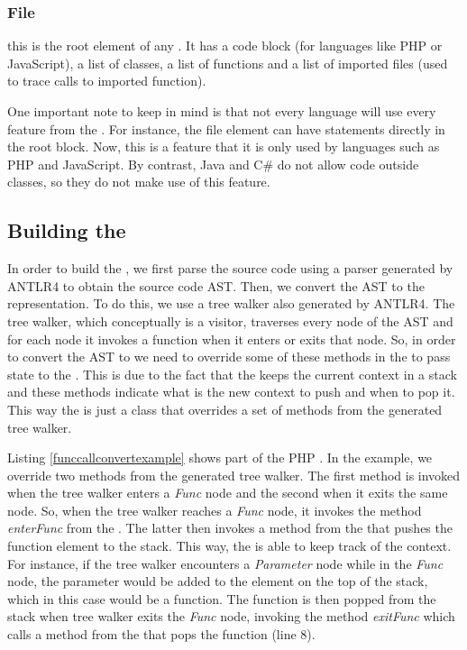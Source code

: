 \subsubsection{File} this is the root element of any \astname{}. It has a code block (for languages like PHP or JavaScript), a list of classes, a list of functions and a list of imported files (used to trace calls to imported function).




One important note to keep in mind is that not every language will use every feature from the \astname{}. For instance, the file element can have statements directly in the root block. Now, this is a feature that it is only used by languages such as PHP and JavaScript. By contrast, Java and C\# do not allow code outside classes, so they do not make use of this feature. 

\subsection{Building the \astname{}}
\label{buildgenericast}


In order to build the \astname{}, we first parse the source code using a parser generated by ANTLR4 to obtain the source code AST. Then, we convert the AST to the \astname{} representation. To do this, we use a tree walker also generated by ANTLR4. The tree walker, which conceptually is a visitor, traverses every node of the AST and for each node it invokes a function when it enters or exits that node. So, in order to convert the AST to \astname{} we need to override some of these methods in the \converter{} to pass state to the \astbuilder{}. This is due to the fact that the \astbuilder{} keeps the current context in a stack and these methods indicate what is the new context to push and when to pop it. This way the \converter{} is just a class that overrides a set of methods from the generated tree walker. 

Listing \ref{funccallconvertexample} shows part of the PHP \converter{}. In the example, we override two methods from the generated tree walker. The first method is invoked when the tree walker enters a \textit{Func} node and the second when it exits the same node. So, when the tree walker reaches a \textit{Func} node, it invokes the method \textit{enterFunc} from the \converter{}. The latter then invokes a method from the \astbuilder{} that pushes the function element to the stack. This way, the \astbuilder{} is able to keep track of the context. For instance, if the tree walker encounters a \textit{Parameter} node while in the \textit{Func} node, the parameter would be added to the element on the top of the stack, which in this case would be a function. The function is then popped from the stack when tree walker exits the \textit{Func} node, invoking the method \textit{exitFunc} which calls a method from the \astbuilder{} that pops the function (line 8). 

